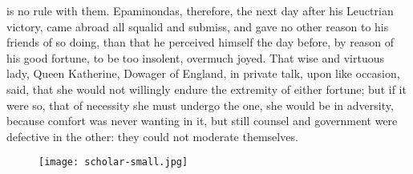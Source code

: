 {is no rule with them. Epaminondas, therefore, the next day after his
Leuctrian victory, came abroad all squalid and submiss, and gave
no other reason to his friends of so doing, than that he perceived
himself the day before, by reason of his good fortune, to be too
insolent, overmuch joyed. That wise and virtuous lady, Queen
Katherine, Dowager of England, in private talk, upon like occasion,
said, that she would not willingly endure the extremity of either
fortune; but if it were so, that of necessity she must undergo the one,
she would be in adversity, because comfort was never wanting in it, but
still counsel and government were defective in the other: they could
not moderate themselves.

\cleartoleftpage{}
\begin{figure}[p]
  \begingroup
  \centering
  \texttt{[image: scholar-small.jpg]}
  \label{fig:scholar}
\end{figure}

\clearpage{}
\thispagestyle{titleontop}

}
